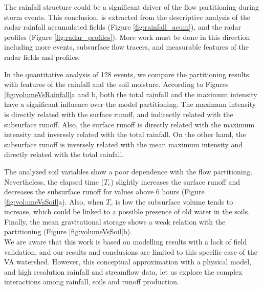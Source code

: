 \documentclass[preprint,12pt]{elsarticle}
\begin{document}
The rainfall structure could be a significant driver of the flow partitioning during storm events.  This conclusion, is extracted from the descriptive analysis of the radar rainfall accumulated fields (Figure \ref{fig:rainfall_acum}), and the radar profiles (Figure \ref{fig:radar_profiles}).  More work must be done in this direction including more events, subsurface flow tracers, and measurable features of the radar fields and profiles. 

In the quantitative analysis of 128 events, we compare the partitioning results with features of the rainfall and the soil moisture.  According to Figures \ref{fig:volumeVsRainfall}a and b, both the total rainfall and the maximum intensity have a significant influence over the model partitioning.  The maximum intensity is directly related with the surface runoff, and indirectly related with the subsurface runoff. Also, the surface runoff is directly related with the maximum intensity and inversely related with the total rainfall. On the other hand, the subsurface runoff is inversely related with the mean maximum intensity and directly related with the total rainfall.  

The analyzed soil variables show a poor dependence with the flow partitioning. Nevertheless, the elapsed time ($T_e$) slightly increases the surface runoff and decreases the subsurface runoff for values above 6 hours (Figure \ref{fig:volumeVsSoil}a). Also, when $T_e$ is low the subsurface volume tends to increase, which could be linked to a possible presence of old water in the soils.  Finally,  the mean gravitational storage shows a weak relation with the partitioning (Figure \ref{fig:volumeVsSoil}b).\\

We are aware that this work is based on modelling results with a lack of field validation, and our results and conclusions are limited to this specific case of the VA watershed. However, this conceptual approximation with a physical model, and high resolution rainfall and streamflow data, let us explore the complex interactions among rainfall, soils and runoff production.\\ 


\end{document}
